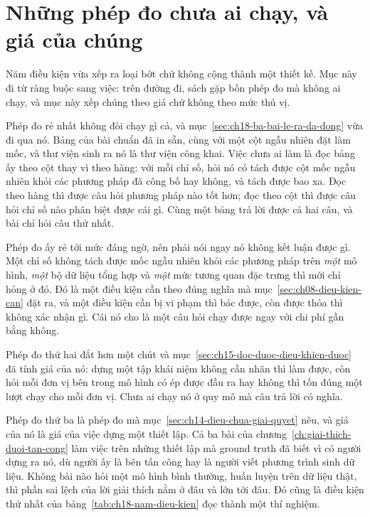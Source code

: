 \section{Những phép đo chưa ai chạy, và giá của chúng}
\label{sec:ch18-phep-do-chua-ai-chay}

%
Năm điều kiện vừa xếp ra loại bớt chứ không cộng thành một thiết kế. Mục này đi
từ ràng buộc sang việc: trên đường đi, sách gặp bốn phép đo mà không ai chạy, và
mục này xếp chúng theo giá chứ không theo mức thú vị.

%
Phép đo rẻ nhất không đòi chạy gì cả, và
mục~\ref{sec:ch18-ba-bai-le-ra-da-dong} vừa đi qua nó. Bảng của bài chuẩn đã in
sẵn, cùng với một cột ngẫu nhiên đặt làm mốc, và thư viện sinh ra nó là thư viện
công khai. Việc chưa ai làm là đọc bảng ấy theo cột thay vì theo hàng: với mỗi
chỉ số, hỏi nó có tách được cột mốc ngẫu nhiên khỏi các phương pháp đã công bố
hay không, và tách được bao xa. Đọc theo hàng thì được câu hỏi phương pháp nào
tốt hơn; đọc theo cột thì được câu hỏi chỉ số nào phân biệt được cái gì. Cùng một
bảng trả lời được cả hai câu, và bài chỉ hỏi câu thứ nhất.

Phép đo ấy rẻ tới mức đáng ngờ, nên phải nói ngay nó không kết luận được gì. Một
chỉ số không tách được mốc ngẫu nhiên khỏi các phương pháp trên \emph{một} mô
hình, \emph{một} bộ dữ liệu tổng hợp và \emph{một} mức tương quan đặc trưng thì
mới chỉ hỏng ở đó. Đó là một điều kiện cần theo đúng nghĩa mà
mục~\ref{sec:ch08-dieu-kien-can} đặt ra, và một điều kiện cần bị vi phạm thì bác
được, còn được thỏa thì không xác nhận gì. Cái nó cho là một câu hỏi chạy được
ngay với chi phí gần bằng không.

%
Phép đo thứ hai đắt hơn một chút và
mục~\ref{sec:ch15-doc-duoc-dieu-khien-duoc} đã tính giá của nó: dựng một tập khái
niệm không cần nhãn thì làm được, còn hỏi mỗi đơn vị bên trong mô hình có ép được
đầu ra hay không thì tốn đúng một lượt chạy cho mỗi đơn vị. Chưa ai chạy nó ở quy
mô mà câu trả lời có nghĩa.

%
Phép đo thứ ba là phép đo mà mục~\ref{sec:ch14-dieu-chua-giai-quyet} nêu, và giá
của nó là giá của việc dựng một thiết lập. Cả ba bài của
chương~\ref{ch:giai-thich-duoi-tan-cong} làm việc trên những thiết lập mà ground
truth đã biết vì có người dựng ra nó, dù người ấy là bên tấn công hay là người
viết phương trình sinh dữ liệu. Không bài nào hỏi một mô hình bình thường, huấn
luyện trên dữ liệu thật, thì phần sai lệch của lời giải thích nằm ở đâu và lớn
tới đâu. Đó cũng là điều kiện thứ nhất của
bảng~\ref{tab:ch18-nam-dieu-kien} đọc thành một thí nghiệm.

